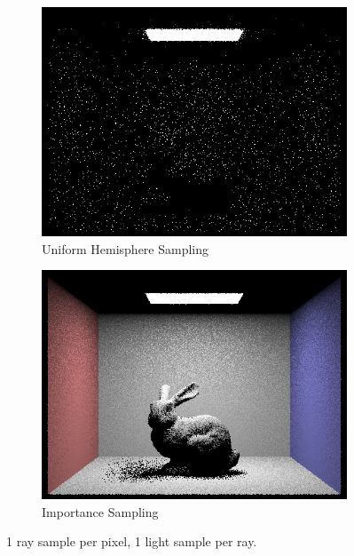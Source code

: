 \documentclass{article}
\begin{document}
\begin{figure}[h]%

\begin{subfigure}[h]{0.4\textwidth}
\includegraphics[width=\textwidth]{task3/CBbunny_1_1_h.png}
\caption{Uniform Hemisphere Sampling}
\end{subfigure}
\hfill\vrule\hfill
\begin{subfigure}[h]{0.4\textwidth}
\includegraphics[width=\textwidth]{task3/CBbunny_1_1.png}
\caption{Importance Sampling}
\end{subfigure}%

\caption[f1]{1 ray sample per pixel, 1 light sample per ray.}
\end{figure}
\\
\end{document}

